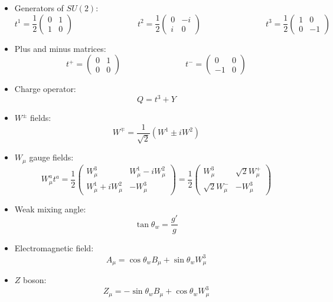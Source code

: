 \documentclass[11pt, oneside]{article}   	%
\theoremstyle{definition}
\begin{document}
\begin{itemize}

	\item Generators of $SU(2)$:
	$$
		t^1 = \frac{1}{2}\begin{pmatrix}
			0 & 1 \\ 1 & 0
		\end{pmatrix}
	\;\;\;\;\;\;\;\;\;\;\;\;\;\;\;\;\;\;\;\;\;\;\;\;\;\;\;\;
		t^2 = \frac{1}{2}\begin{pmatrix}
			0 & -i \\ i & 0
		\end{pmatrix}	
	\;\;\;\;\;\;\;\;\;\;\;\;\;\;\;\;\;\;\;\;\;\;\;\;\;\;\;\;
		t^3 = \frac{1}{2}\begin{pmatrix}
			1 & 0 \\ 0 & -1
		\end{pmatrix}
	$$
	\item Plus and minus matrices:
	$$
		t^+ = \begin{pmatrix}
			0 & 1 \\ 0 & 0
		\end{pmatrix}
	\;\;\;\;\;\;\;\;\;\;\;\;\;\;\;\;\;\;\;\;\;\;\;\;\;\;\;\;
		t^- = \begin{pmatrix}
			0 & 0 \\ -1 & 0
		\end{pmatrix}
	$$

	\item Charge operator:
	$$
		Q = t^3 + Y
	$$
	
	\item $W^\pm$ fields:
	$$
		W^{\mp} = \frac{1}{\sqrt 2}\left(W^1\pm iW^2\right)
	$$
	
	\item $W_\mu$ gauge fields:
	$$
		W_\mu^a t^a 
		= \frac{1}{2}\begin{pmatrix} W_\mu^3 & W_\mu^1 - i W_\mu^2 \\ W_\mu^1 + i W_\mu^2 & -W_\mu^3\end{pmatrix} 
		= \frac{1}{2}\begin{pmatrix} W_\mu^3 & \sqrt 2 W_\mu^+ \\ \sqrt{2} W_\mu^- & -W_\mu^3 \end{pmatrix}
	$$
	
	\item Weak mixing angle:
	$$
		\tan\theta_w = \frac{g'}{g}
	$$
	
	\item Electromagnetic field:
	$$
		A_\mu = \cos\theta_w B_\mu + \sin\theta_w W_\mu^3
	$$
	
	\item $Z$ boson:
	$$
		Z_\mu = -\sin\theta_w B_\mu + \cos\theta_w W_\mu^3
	$$
	

\end{itemize}
\end{document}
